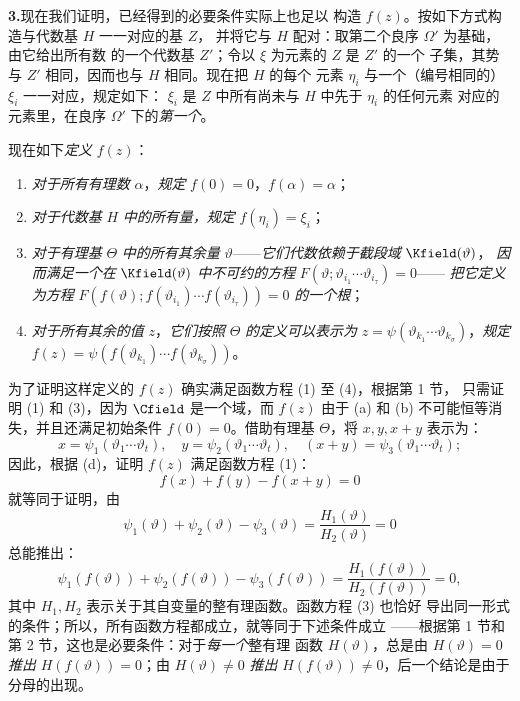 \noindent\textbf{3.}\quad 现在我们证明，已经得到的必要条件实际上也足以
构造 \(f(z)\)。按如下方式构造与代数基 \(H\) 一一对应的基 \(Z\)，
并将它与 \(H\) 配对：取第二个良序 \(\Omega'\) 为基础，由它给出所有数
的一个代数基 \(Z'\)；令以 \(\xi\) 为元素的 \(Z\) 是 \(Z'\) 的一个
子集，其势与 \(Z'\) 相同，因而也与 \(H\) 相同。现在把 \(H\) 的每个
元素 \(\eta_i\) 与一个（编号相同的）\(\xi_i\) 一一对应，规定如下：
\(\xi_i\) 是 \(Z\) 中所有尚未与 \(H\) 中先于 \(\eta_i\) 的任何元素
对应的元素里，在良序 \(\Omega'\) 下的\emph{第一个}。

现在如下\emph{定义} \(f(z)\)：
\begin{enumerate}
\item[(a)] \emph{对于所有有理数} \(\alpha\)，\emph{规定}
\(f(0)=0\)，\(f(\alpha)=\alpha\)；
\item[(b)] \emph{对于代数基} \(H\) \emph{中的所有量，规定}
\(f(\eta_i)=\xi_i\)；
\item[(c)] \emph{对于有理基} \(\Theta\) \emph{中的所有其余量}
\(\vartheta\)——\emph{它们代数依赖于截段域} \(\Kfield(\vartheta)\)，
\emph{因而满足一个在} \(\Kfield(\vartheta)\) \emph{中不可约的方程}
\(F(\vartheta;\vartheta_{i_1}\cdots\vartheta_{i_\tau})=0\)——
\emph{把它定义为方程}
\(F(f(\vartheta);f(\vartheta_{i_1})\cdots f(\vartheta_{i_\tau}))=0\)
\emph{的一个根}；
\item[(d)] \emph{对于所有其余的值} \(z\)，\emph{它们按照}
\(\Theta\) \emph{的定义可以表示为}
\(z=\psi(\vartheta_{k_1}\cdots\vartheta_{k_\sigma})\)，\emph{规定}
\(f(z)=\psi(f(\vartheta_{k_1})\cdots f(\vartheta_{k_\sigma}))\)。
\end{enumerate}
为了证明这样定义的 \(f(z)\) 确实满足函数方程 (1) 至 (4)，根据第 1 节，
只需证明 (1) 和 (3)，因为 \(\Cfield\) 是一个域，而 \(f(z)\) 由于
(a) 和 (b) 不可能恒等消失，并且还满足初始条件 \(f(0)=0\)。借助有理基
\(\Theta\)，将 \(x,y,x+y\) 表示为：
\[
x=\psi_1(\vartheta_1\cdots\vartheta_t),\quad
 y=\psi_2(\vartheta_1\cdots\vartheta_t),\quad
 (x+y)=\psi_3(\vartheta_1\cdots\vartheta_t);
\]
因此，根据 (d)，证明 \(f(z)\) 满足函数方程 (1)：
\[
f(x)+f(y)-f(x+y)=0
\]
就等同于证明，由
\[
\psi_1(\vartheta)+\psi_2(\vartheta)-\psi_3(\vartheta)
 =\frac{H_1(\vartheta)}{H_2(\vartheta)}=0
\]
总能推出：
\[
\psi_1(f(\vartheta))+\psi_2(f(\vartheta))-\psi_3(f(\vartheta))
 =\frac{H_1(f(\vartheta))}{H_2(f(\vartheta))}=0,
\]
其中 \(H_1,H_2\) 表示关于其自变量的整有理函数。函数方程 (3) 也恰好
导出同一形式的条件；所以，所有函数方程都成立，就等同于下述条件成立
——根据第 1 节和第 2 节，这也是必要条件：对于\emph{每一个}整有理
函数 \(H(\vartheta)\)，总是由 \(H(\vartheta)=0\) \emph{推出}
\(H(f(\vartheta))=0\)；由 \(H(\vartheta)\ne0\) \emph{推出}
\(H(f(\vartheta))\ne0\)，后一个结论是由于分母的出现。

